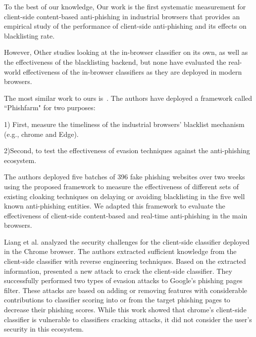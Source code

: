 \documentclass[letterpaper,twocolumn,10pt]{article}
\begin{document}

To the best of our knowledge, Our work is the first systematic measurement for client-side content-based anti-phishing in industrial browsers that provides an empirical study of the performance of client-side anti-phishing and its effects on blacklisting rate. 

However, Other studies looking at the in-browser classifier on its own, as well as the effectiveness of the blacklisting backend, but none have evaluated the real-world effectiveness of the in-browser classifiers as they are deployed in modern browsers.

The most similar work to ours is~\cite{oest2019phishfarm}. The authors have deployed a framework called ``Phishfarm" for two purposes: 

1) First, measure the timeliness of the industrial browsers' blacklist mechanism (e.g., chrome and Edge). 

2)Second, to test the effectiveness of evasion techniques against the anti-phishing ecosystem.

The authors deployed five batches of 396 fake phishing websites over two weeks using the proposed framework to measure the effectiveness of different sets of existing cloaking techniques on delaying or avoiding blacklisting in the five well known anti-phishing entities.
We adapted this framework to evaluate the effectiveness of client-side content-based and real-time anti-phishing in the main browsers.

Liang et al.\cite{liang2016cracking} analyzed the security challenges for the client-side classifier deployed in the Chrome browser. 
The authors extracted sufficient knowledge from the client-side classifier with reverse engineering techniques. Based on the extracted information, presented a new attack to crack the client-side classifier. They successfully performed two types of evasion attacks to Google's phishing pages filter. These attacks are based on adding or removing features with considerable contributions to classifier scoring into or from the target phishing pages to decrease their phishing scores.
While this work showed that chrome's client-side classifier is vulnerable to classifiers cracking attacks, it did not consider the user's security in this ecosystem.
\end{document}
